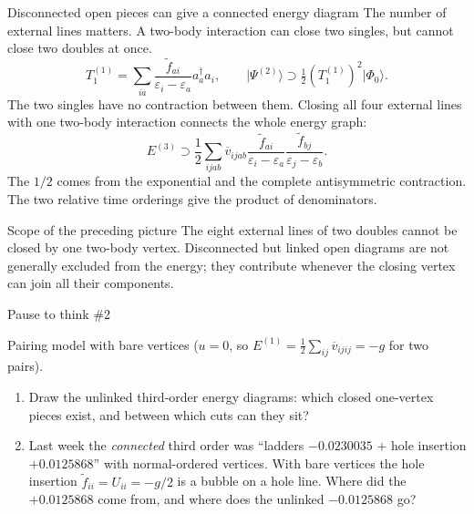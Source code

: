 \documentclass[aspectratio=169,10pt]{beamer}
\newcounter{thinkctr}
\newcommand{\thinkq}[2]{%
  \stepcounter{thinkctr}%
  \vfill
  \begin{tcolorbox}[enhanced,colback=palewarm,colframe=warm,boxrule=1.2pt,arc=4pt,
    grow to left by=6mm,grow to right by=6mm,
    left=16pt,right=16pt,top=16pt,bottom=18pt,
    fonttitle=\bfseries\Large,fontupper=\Large,
    title={Pause to think \#\thethinkctr\hfill\mdseries\normalsize(about #1 min -- discuss with your neighbour)}]
  #2
  \end{tcolorbox}
  \vfill}
\newcommand{\ket}[1]{\vert #1\rangle}
\newcommand{\cre}[1]{a_{#1}^{\dagger}}
\newcommand{\ann}[1]{a_{#1}}
\newcommand{\vbar}[4]{\overline v_{#1#2#3#4}}
\newcommand{\ph}{\Phi_0}
\newcommand{\ftil}[1]{\tilde f_{#1}}
\begin{document}
\begin{frame}{Disconnected open pieces can give a connected energy diagram}
\small
The number of external lines matters. A two-body interaction can close two singles, but cannot close two doubles at once.
\[
 T_1^{(1)}=\sum_{ia}\frac{\ftil{ai}}{\varepsilon_i-\varepsilon_a}\cre{a}\ann{i},
 \qquad \ket{\Psi^{(2)}}\supset\tfrac12(T_1^{(1)})^2\ket{\ph}.
\]
The two singles have no contraction between them. Closing all four external lines with one two-body interaction connects the whole energy graph:
\[
 E^{(3)}\supset\frac12\sum_{ijab}\vbar{i}{j}{a}{b}
 \frac{\ftil{ai}}{\varepsilon_i-\varepsilon_a}
 \frac{\ftil{bj}}{\varepsilon_j-\varepsilon_b}.
\]
The $1/2$ comes from the exponential and the complete antisymmetric contraction. The two relative time orderings give the product of denominators.
\begin{block}{Scope of the preceding picture}
The eight external lines of two doubles cannot be closed by one two-body vertex. Disconnected but linked open diagrams are not generally excluded from the energy; they contribute whenever the closing vertex can join all their components.
\end{block}
\end{frame}


\begin{frame}{Pause to think \#2}
\thinkq{3}{Pairing model with bare vertices ($u=0$, so $E^{(1)}=\tfrac12\sum_{ij}\vbar{i}{j}{i}{j}=-g$ for two pairs).
\begin{enumerate}
\item Draw the unlinked third-order energy diagrams: which closed one-vertex pieces exist, and between which cuts can they sit?
\item Last week the \emph{connected} third order was ``ladders $-0.0230035$ $+$ hole insertion $+0.0125868$'' with normal-ordered vertices. With bare vertices the hole insertion $\ftil{ii}=U_{ii}=-g/2$ is a bubble on a hole line. Where did the $+0.0125868$ come from, and where does the unlinked $-0.0125868$ go?
\end{enumerate}}
\end{frame}
\end{document}
